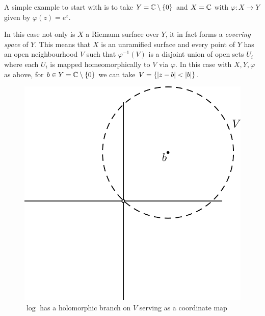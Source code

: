 \begin{example}
    A simple example to start with is to take $Y = \mathbb{C} \setminus \{0\}$ and $X = \mathbb{C}$ with $\varphi: X \to Y$ given by $\varphi(z) = e^z$. 

    In this case not only is $X$ a Riemann surface over $Y$, it in fact forms a \textit{covering space} of $Y$. This means that $X$ is an unramified surface and every point of $Y$ has an open neighbourhood $V$ such that $\varphi^{-1}(V)$ is a disjoint union of open sets $U_i$ where each $U_i$ is mapped homeomorphically to $V$ via $\varphi$. In this case with $X, Y, \varphi$ as above, for $b \in Y = \mathbb{C} \setminus \{0\}$ we can take $V = \{\left|z - b\right| < \left|b\right|\}$. 

\end{example}
\begin{figure}[ht]
    \centering
    \includegraphics[scale=0.5]{Images/log_cover_riem_surf.png}
    \caption{$\log$ has a holomorphic branch on $V$ serving as a coordinate map}
    \label{fig:log-cover-riem-surf}
\end{figure}

